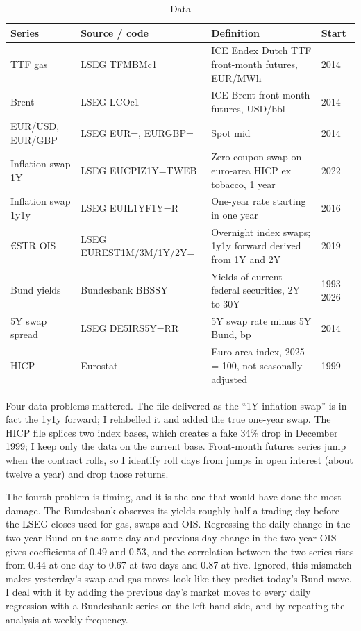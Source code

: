 \documentclass[11pt,a4paper]{article}
\begin{document}
\begin{table}[htbp]\centering\footnotesize
\caption{Data}\label{tab:data}
\begin{tabularx}{\textwidth}{@{}l l X l@{}}
\toprule
Series & Source / code & Definition & Start\\\midrule
TTF gas & LSEG TFMBMc1 & ICE Endex Dutch TTF front-month futures, EUR/MWh & 2014\\
Brent & LSEG LCOc1 & ICE Brent front-month futures, USD/bbl & 2014\\
EUR/USD, EUR/GBP & LSEG EUR=, EURGBP= & Spot mid & 2014\\
Inflation swap 1Y & LSEG EUCPIZ1Y=TWEB & Zero-coupon swap on euro-area HICP ex tobacco, 1 year & 2022\\
Inflation swap 1y1y & LSEG EUIL1YF1Y=R & One-year rate starting in one year & 2016\\
\euro{}STR OIS & LSEG EUREST1M/3M/1Y/2Y= & Overnight index swaps; 1y1y forward derived from 1Y and 2Y & 2019\\
Bund yields & Bundesbank BBSSY & Yields of current federal securities, 2Y to 30Y & 1993--2026\\
5Y swap spread & LSEG DE5IRS5Y=RR & 5Y swap rate minus 5Y Bund, bp & 2014\\
HICP & Eurostat & Euro-area index, 2025 = 100, not seasonally adjusted & 1999\\
\bottomrule
\end{tabularx}
\end{table}

Four data problems mattered. The file delivered as the ``1Y inflation swap'' is in fact the 1y1y forward; I relabelled
it and added the true one-year swap. The HICP file splices two index bases, which creates a fake 34\% drop in December
1999; I keep only the data on the current base. Front-month futures series jump when the contract rolls, so I identify
roll days from jumps in open interest (about twelve a year) and drop those returns.

The fourth problem is timing, and it is the one that would have done the most damage. The Bundesbank observes its
yields roughly half a trading day before the LSEG closes used for gas, swaps and OIS. Regressing the daily change in the
two-year Bund on the same-day and previous-day change in the two-year OIS gives coefficients of 0.49 and
0.53, and the correlation between the two series rises from 0.44 at one day to 0.67 at two days and 0.87
at five. Ignored, this mismatch makes yesterday's swap and gas moves look like they predict today's Bund move. I deal
with it by adding the previous day's market moves to every daily regression with a Bundesbank series on the left-hand
side, and by repeating the analysis at weekly frequency.
\end{document}
